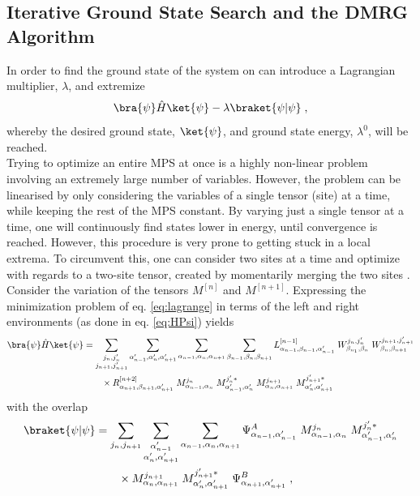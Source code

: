 \subsection{Iterative Ground State Search and the DMRG Algorithm} \label{sec:DMRG}
In order to find the ground state of the system on can introduce a Lagrangian multiplier, $\lambda$, and extremize
\begin{equation}
	\bra{\psi} \hat{H} \ket{\psi} - \lambda \braket{\psi | \psi} \; ,
	\label{eq:lagrange}
\end{equation}
whereby the desired ground state, $\ket{\psi}$, and ground state energy, $\lambda^0$, will be reached.\\
Trying to optimize an entire MPS at once is a highly non-linear problem involving an extremely large number of variables. However, the problem can be linearised by only considering the variables of a single tensor (site) at a time, while keeping the rest of the MPS constant. By varying just a single tensor at a time, one will continuously find states lower in energy, until convergence is reached. However, this procedure is very prone to getting stuck in a local extrema. To circumvent this, one can consider two sites at a time and optimize with regards to a two-site tensor, created by momentarily merging the two sites \cite{White1993}.\\
Consider the variation of the tensors $M^{[n]}$ and $M^{[n+1]}$. Expressing the minimization problem of eq. \eqref{eq:lagrange} in terms of the left and right environments (as done in eq. \eqref{eq:HPsi}) yields
\begin{align}
	\bra{\psi} \hat{H} \ket{\psi} &= \sum_{\substack{j_n , j_n ' \\ j_{n+1} , j_{n+1} '}} \sum_{\alpha_{n-1} ' , \alpha_n ', \alpha_{n+1} '} \sum_{\alpha_{n-1} , \alpha_n , \alpha_{n+1}} \sum_{\beta_{n-1} , \beta_n , \beta_{n+1}} L_{\alpha_{n-1}, \beta_{n-1} , \alpha_{n-1} '}^{[n-1]} \; W_{\beta_{n_1}, \beta_n}^{j_n , j_n '} \; W_{\beta_{n}, \beta_{n+1}}^{ j_{n+1} , j_{n+1} '} \nonumber \\
	& \qquad \times R_{\alpha_{n+1} ,\beta_{n+1} , \alpha_{n+1} '}^{[n+2]} \; M_{\alpha_{n-1} , \alpha_{n}}^{j_n } \; M_{\alpha_{n-1} ' , \alpha_{n} '}^{j_n ' *} \; M_{\alpha_{n} , \alpha_{n+1}}^{j_{n+1} } \; M_{\alpha_{n} ' , \alpha_{n+1} '}^{j_{n+1} ' *}  \label{eq:twositeHamil}
\end{align}
with the overlap
\begin{align}
	\braket{\psi | \psi} &= \sum_{j_n , j_{n+1} } \sum_{\substack{\alpha_{n-1} ' \\ \alpha_n ', \alpha_{n+1} '}} \sum_{\alpha_{n-1} , \alpha_n ,\alpha_{n+1}} \Psi_{\alpha_{n-1},\alpha_{n-1}'}^{A} \; M_{\alpha_{n-1} , \alpha_{n}}^{ j_n } \; M_{\alpha_{n-1} ' , \alpha_{n} '}^{j_n ' *} \nonumber \\
	& \qquad \times M_{\alpha_{n} , \alpha_{n+1}}^{j_{n+1} } \; M_{\alpha_{n} ' , \alpha_{n+1} '}^{j_{n+1} ' *} \; \Psi_{\alpha_{n+1},\alpha_{n+1}'}^{B} \; , \label{eq:twositeOverlap}
\end{align}
